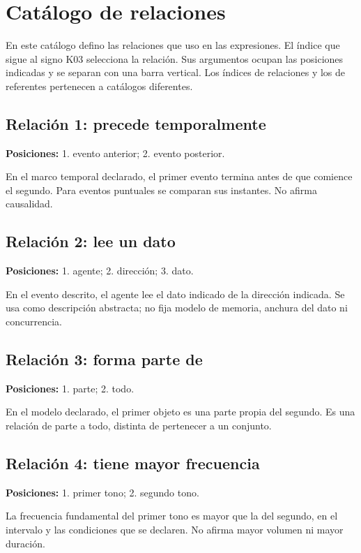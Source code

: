 \section{Catálogo de relaciones}\label{sec:relaciones}

En este catálogo defino las relaciones que uso en las expresiones.
El índice que sigue al signo K03 selecciona la relación. Sus argumentos
ocupan las posiciones indicadas y se separan con una barra vertical.
Los índices de relaciones y los de referentes pertenecen a catálogos diferentes.

\subsection{Relación 1: precede temporalmente}

\textbf{Posiciones:} 1. evento anterior; 2. evento posterior.

En el marco temporal declarado, el primer evento termina antes de que comience el segundo. Para eventos puntuales se comparan sus instantes. No afirma causalidad.

\subsection{Relación 2: lee un dato}

\textbf{Posiciones:} 1. agente; 2. dirección; 3. dato.

En el evento descrito, el agente lee el dato indicado de la dirección indicada. Se usa como descripción abstracta; no fija modelo de memoria, anchura del dato ni concurrencia.

\subsection{Relación 3: forma parte de}

\textbf{Posiciones:} 1. parte; 2. todo.

En el modelo declarado, el primer objeto es una parte propia del segundo. Es una relación de parte a todo, distinta de pertenecer a un conjunto.

\subsection{Relación 4: tiene mayor frecuencia}

\textbf{Posiciones:} 1. primer tono; 2. segundo tono.

La frecuencia fundamental del primer tono es mayor que la del segundo, en el intervalo y las condiciones que se declaren. No afirma mayor volumen ni mayor duración.


